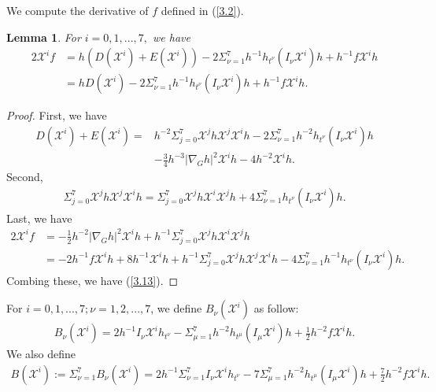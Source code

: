 \documentclass[10pt,a4paper]{amsart}
\numberwithin{equation}{section}
\newtheorem{lemma}[theorem]{Lemma}
\begin{document}
  We compute the derivative of $f$ defined in (\ref{3.2}).
  \begin{lemma}\label{lemma3.2} For $i=0,1,...,7,$ we have
  \begin{equation}\label{3.13}       \begin{aligned}
    2\mathscr{X}^i f&=h(D(\mathscr{X}^i)+E(\mathscr{X}^i))- 2\Sigma_{\nu=1}^7h^{-1}h_{t^\nu}(I_\nu \mathscr{X}^i)h+h^{-1}f\mathscr{X}^ih\\&=hD(\mathscr{X}^i)- 2\Sigma_{\nu=1}^7h^{-1}h_{t^\nu}(I_\nu \mathscr{X}^i)h+h^{-1}f\mathscr{X}^ih.\end{aligned}   \end{equation}
          \end{lemma}
\begin{proof}

 First, we have
    \begin{align*}
    D(\mathscr{X}^i)+E(\mathscr{X}^i)=&h^{-2}\Sigma_{j=0}^7\mathscr{X}^jh\mathscr{X}^j\mathscr{X}^ih-2\Sigma_{\nu=1}^7h^{-2}h_{t^\nu}(I_\nu \mathscr{X}^i)h\\&-\frac{3}{4}h^{-3}|\nabla_G h|^2\mathscr{X}^ih-4h^{-2}\mathscr{X}^ih.
\end{align*}
Second,
\begin{align*}
    \Sigma_{j=0}^7\mathscr{X}^j h \mathscr{X}^j\mathscr{X}^ih=\Sigma_{j=0}^7\mathscr{X}^j h \mathscr{X}^i\mathscr{X}^j h+4\Sigma_{\nu=1}^7h_{t^\nu}(I_\nu \mathscr{X}^i) h.
    \end{align*} 
    Last, we have
\begin{align*}
    2\mathscr{X}^if&=-\frac{1}{2}h^{-2}|\nabla_G h|^2\mathscr{X}^ih+h^{-1}\Sigma_{j=0}^7\mathscr{X}^j h \mathscr{X}^i\mathscr{X}^j h\\&=-2h^{-1}f\mathscr{X}^ih+8h^{-1}\mathscr{X}^ih+h^{-1}\Sigma_{j=0}^7\mathscr{X}^jh\mathscr{X}^j\mathscr{X}^ih-4\Sigma_{\nu=1}^7h^{-1}h_{t^\nu}(I_\nu \mathscr{X}^i)h.
    \end{align*}
    Combing these, we have (\ref{3.13}).
    \end{proof}
For $i=0,1,...,7; \nu=1,2,...,7$, we define $B_\nu(\mathscr{X}^i)$ as follow:
\begin{align}\label{3.14}
    B_\nu(\mathscr{X}^i)=2h^{-1}I_\nu \mathscr{X}^i h_{t^\nu}-\Sigma_{\mu=1}^7h^{-2}h_{t^\mu}(I_\mu \mathscr{X}^i)h+\frac{1}{2}h^{-2}f\mathscr{X}^ih.
\end{align}
 We also define
\begin{align}\label{3.15}
    B(\mathscr{X}^i):=\Sigma_{\nu=1}^7 B_\nu (\mathscr{X}^i)=2h^{-1}\Sigma_{\nu=1}^7I_\nu \mathscr{X}^i h_{t^\nu}-7\Sigma_{\mu=1}^7h^{-2}h_{t^\mu}(I_\mu \mathscr{X}^i)h+\frac{7}{2}h^{-2}f\mathscr{X}^ih.\end{align}
\end{document}
